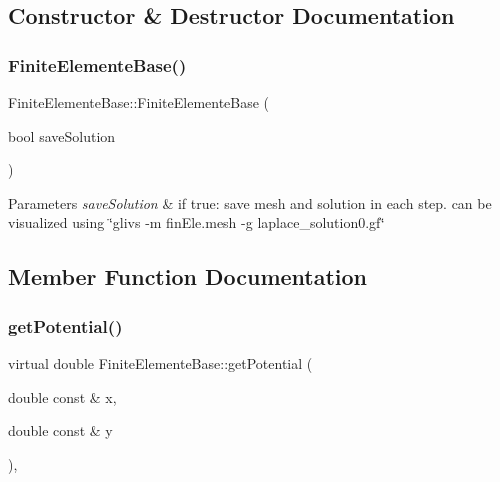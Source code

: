 \subsection{Constructor \& Destructor Documentation}
\mbox{\label{classFiniteElementeBase_a64ce4d3439a1ca2dfad3fdbe65f1b128}} 
\subsubsection{\texorpdfstring{Finite\+Elemente\+Base()}{FiniteElementeBase()}}
{\footnotesize\ttfamily Finite\+Elemente\+Base\+::\+Finite\+Elemente\+Base (\begin{DoxyParamCaption}\item[{bool}]{save\+Solution }\end{DoxyParamCaption})}


\begin{DoxyParams}{Parameters}
{\em save\+Solution} & if true\+: save mesh and solution in each step. can be visualized using \char`\"{}glivs -\/m fin\+Ele.\+mesh -\/g laplace\+\_\+solution0.\+gf\char`\"{} \\
\hline
\end{DoxyParams}


\subsection{Member Function Documentation}
\mbox{\label{classFiniteElementeBase_aee384092436f2288ba1ceaf0f279afed}} 
\subsubsection{\texorpdfstring{get\+Potential()}{getPotential()}}
{\footnotesize\ttfamily virtual double Finite\+Elemente\+Base\+::get\+Potential (\begin{DoxyParamCaption}\item[{double const \&}]{x,  }\item[{double const \&}]{y }\end{DoxyParamCaption})\hspace{0.3cm}{\ttfamily [inline]}, {\ttfamily [virtual]}}

